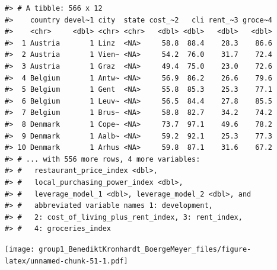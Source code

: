 \documentclass[
  11pt,
  a4paper,
  twoside]{scrbook}
\newenvironment{Shaded}{\begin{snugshade}}{\end{snugshade}}
\newcommand{\AttributeTok}[1]{\textcolor[rgb]{0.77,0.63,0.00}{#1}}
\newcommand{\FunctionTok}[1]{\textcolor[rgb]{0.00,0.00,0.00}{#1}}
\newcommand{\NormalTok}[1]{#1}
\newcommand{\SpecialCharTok}[1]{\textcolor[rgb]{0.00,0.00,0.00}{#1}}
\newcommand{\StringTok}[1]{\textcolor[rgb]{0.31,0.60,0.02}{#1}}
\begin{document}
\linespread{1}

\begin{verbatim}
#> # A tibble: 566 x 12
#>    country devel~1 city  state cost_~2   cli rent_~3 groce~4
#>    <chr>     <dbl> <chr> <chr>   <dbl> <dbl>   <dbl>   <dbl>
#>  1 Austria       1 Linz  <NA>     58.8  88.4    28.3    86.6
#>  2 Austria       1 Vien~ <NA>     54.2  76.0    31.7    72.4
#>  3 Austria       1 Graz  <NA>     49.4  75.0    23.0    72.6
#>  4 Belgium       1 Antw~ <NA>     56.9  86.2    26.6    79.6
#>  5 Belgium       1 Gent  <NA>     55.8  85.3    25.3    77.1
#>  6 Belgium       1 Leuv~ <NA>     56.5  84.4    27.8    85.5
#>  7 Belgium       1 Brus~ <NA>     58.8  82.7    34.2    74.2
#>  8 Denmark       1 Cope~ <NA>     73.7  97.1    49.6    78.2
#>  9 Denmark       1 Aalb~ <NA>     59.2  92.1    25.3    77.3
#> 10 Denmark       1 Arhus <NA>     59.8  87.1    31.6    67.2
#> # ... with 556 more rows, 4 more variables:
#> #   restaurant_price_index <dbl>,
#> #   local_purchasing_power_index <dbl>,
#> #   leverage_model_1 <dbl>, leverage_model_2 <dbl>, and
#> #   abbreviated variable names 1: development,
#> #   2: cost_of_living_plus_rent_index, 3: rent_index,
#> #   4: groceries_index
\end{verbatim}

\linespread{1}

\begin{Shaded}
\end{Shaded}

\linespread{1}\texttt{[image: group1\_BenediktKronhardt\_BoergeMeyer\_files/figure-latex/unnamed-chunk-51-1.pdf]} \linespread{1}

\begin{Shaded}
\end{Shaded}
\end{document}
